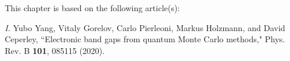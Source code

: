 This chapter is based on the following article(s):

\textit{I}. Yubo Yang, Vitaly Gorelov, Carlo Pierleoni, Markus Holzmann, and David Ceperley, ``Electronic band gaps from quantum Monte Carlo methods," Phys. Rev. B \textbf{101}, 085115 (2020).

